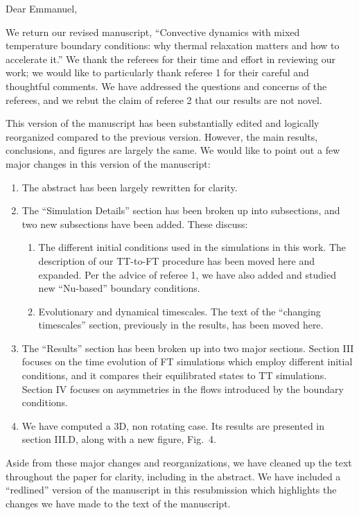 \documentclass[aps, 11pt, singlecolumn]{revtex4-1} %
\begin{document}
\newenvironment{myquotation}{
\begin{quotation}
\itshape
}{ 
\end{quotation}
}
\noindent
Dear Emmanuel,
$\,$\newline

\begin{singlespace}
We return our revised manuscript, ``Convective dynamics with mixed temperature boundary conditions: why thermal relaxation matters and how to accelerate it.'' 
We thank the referees for their time and effort in reviewing our work; we would like to particularly thank referee 1 for their careful and thoughtful comments.
We have addressed the questions and concerns of the referees, and we rebut the claim of referee 2 that our results are not novel.

This version of the manuscript has been substantially edited and logically reorganized compared to the previous version.
However, the main results, conclusions, and figures are largely the same.
We would like to point out a few major changes in this version of the manuscript:
\begin{enumerate}
\item The abstract has been largely rewritten for clarity.
\item The ``Simulation Details'' section has been broken up into subsections, and two new subsections have been added. These discuss:
\begin{enumerate}
\item The different initial conditions used in the simulations in this work.
The description of our TT-to-FT procedure has been moved here and expanded.
Per the advice of referee 1, we have also added and studied new ``Nu-based'' boundary conditions.
\item Evolutionary and dynamical timescales.
The text of the ``changing timescales'' section, previously in the results, has been moved here.
\end{enumerate}
\item The ``Results'' section has been broken up into two major sections.
Section III focuses on the time evolution of FT simulations which employ different initial conditions, and it compares their equilibrated states to TT simulations.
Section IV focuses on asymmetries in the flows introduced by the boundary conditions.
\item We have computed a 3D, non rotating case.
Its results are presented in section III.D, along with a new figure, Fig.~4.
\end{enumerate}
Aside from these major changes and reorganizations, we have cleaned up the text throughout the paper for clarity, including in the abstract.
We have included a ``redlined'' version of the manuscript in this resubmission which highlights the changes we have made to the text of the manuscript.


\end{singlespace}
\end{document}
